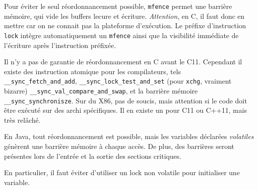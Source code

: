 \documentclass{article}
\begin{document}
Pour éviter le seul réordonnancement possible, \texttt{mfence} permet une barrière mémoire, qui vide les buffers lecure et écriture. \emph{Attention}, en C, il faut donc en mettre car on ne connait pas la plateforme d'exécution. Le préfixe d'instruction \texttt{lock} intègre automatiquement un \texttt{mfence} ainsi que la visibilité immédiate de l'écriture après l'instruction préfixée.
\bigskip


Il n'y a pas de garantie de réordonnancement en C avant le C11. Cependant il existe des instruction atomique pour les compilateurs, tels \texttt{\_\_sync\_fetch\_and\_add}, \texttt{\_\_sync\_lock\_test\_and\_set} (pour \texttt{xchg}, vraiment bizarre) \texttt{\_\_sync\_val\_compare\_and\_swap}, et la barrière mémoire \texttt{\_\_sync\_synchronisze}. Sur du X86, pas de soucis, mais attention si le code doit être exécuté sur des archi spécifiques. Il en existe un pour C11 ou C++11, mais très relâché.
\bigskip


En Java, tout réordonnancement est possible, mais les variables déclarées \emph{volatiles} génèrent une barrière mémoire à chaque accès. De plus, des barrières seront présentes lors de l'entrée et la sortie des sections critiques.
\bigskip

En particulier, il faut éviter d'utiliser un lock non volatile pour initialiser une variable.
\end{document}
